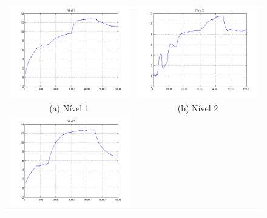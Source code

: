 \begin{figure}[H]
	\centering
	\begin{tabular}{cc}
		\includegraphics[height=0.15\paperheight,keepaspectratio]{img/sim2_h1.png} &
		\includegraphics[height=0.15\paperheight,keepaspectratio]{img/sim2_h2.png} \\
		(a) Nível 1 &
		(b) Nível 2 \\
		\includegraphics[height=0.15\paperheight,keepaspectratio]{img/sim2_h3.png} &

\end{tabular}
\end{figure}
